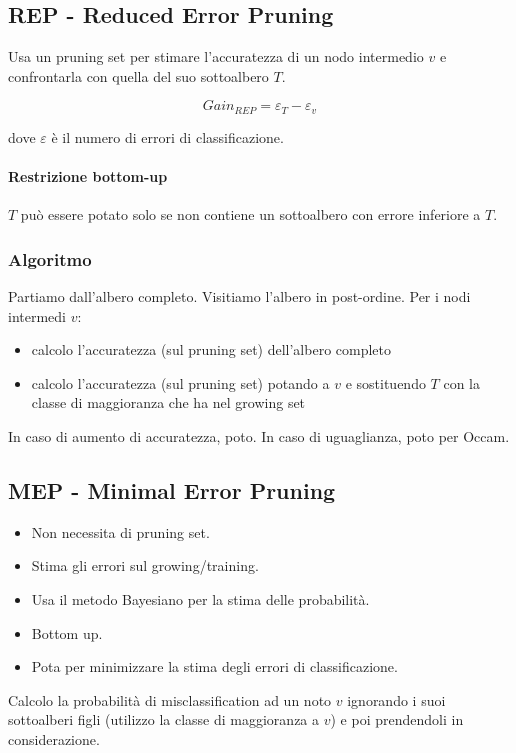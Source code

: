 \documentclass[11pt,onecolumn,a4paper,oneside]{book}
\begin{document}
\subsection{REP - Reduced Error Pruning}
Usa un pruning set per stimare l'accuratezza di un nodo intermedio $v$ e confrontarla con quella del suo sottoalbero $T$.

$$Gain_{REP} = \varepsilon_T - \varepsilon_v$$

dove $\varepsilon$ è il numero di errori di classificazione.

\paragraph{Restrizione bottom-up}
$T$ può essere potato solo se non contiene un sottoalbero con errore inferiore a $T$.

\subsubsection{Algoritmo}
Partiamo dall'albero completo. Visitiamo l'albero in post-ordine. Per i nodi intermedi $v$:
\begin{itemize}
\item calcolo l'accuratezza (sul pruning set) dell'albero completo
\item calcolo l'accuratezza (sul pruning set) potando a $v$ e sostituendo $T$ con la classe di maggioranza che ha nel growing set
\end{itemize}
In caso di aumento di accuratezza, poto. In caso di uguaglianza, poto per Occam.



\subsection{MEP - Minimal Error Pruning}
\begin{itemize}
\item Non necessita di pruning set.
\item Stima gli errori sul growing/training.
\item Usa il metodo Bayesiano per la stima delle probabilità.
\item Bottom up.
\item Pota per minimizzare la stima degli errori di classificazione.
\end{itemize}

Calcolo la probabilità di misclassification ad un noto $v$ ignorando i suoi sottoalberi figli (utilizzo la classe di maggioranza a $v$) e poi prendendoli in considerazione.
\end{document}
